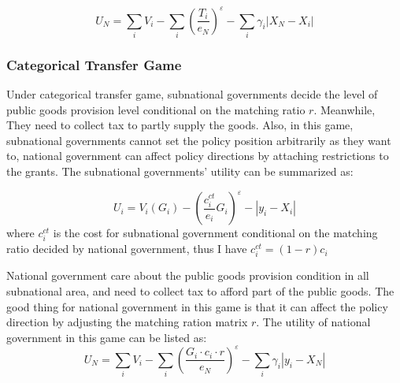 \begin{itemize}
$$U_N=\sum_i V_i-\sum_i\left(\frac{T_i}{e_N}\right)^{\varepsilon}-\sum_i \gamma_i \left|X_N-X_i\right|$$

\subsubsection{Categorical Transfer Game}
Under categorical transfer game, subnational governments decide the level of public goods provision level conditional on the matching ratio $r$. Meanwhile, They need to collect tax to partly supply the goods. Also, in this game, subnational governments cannot set the policy position arbitrarily as they want to, national government can affect policy directions by attaching restrictions to the grants. The subnational governments' utility can be summarized as:

$$U_i=V_i\left(G_i\right)-\left(\frac{c_i^{c t}}{e_i} G_i\right)^{\varepsilon}-\left|y_i-X_i\right|$$
where $c_i^{ct}$ is the cost for subnational government conditional on the matching ratio decided by national government, thus I have $c_i^{ct}=(1-r)c_i$

National government care about the public goods provision condition in all subnational area, and need to collect tax to afford part of the public goods. The good thing for national government in this game is that it can affect the policy direction by adjusting the matching ration matrix $r$. The utility of national government in this game can be listed as:
$$U_N=\sum_i V_i-\sum_i\left(\frac{G_i \cdot c_i \cdot r}{e_N}\right)^{\varepsilon}-\sum_i\gamma_i\left|y_i-X_N\right|$$


\end{itemize}
